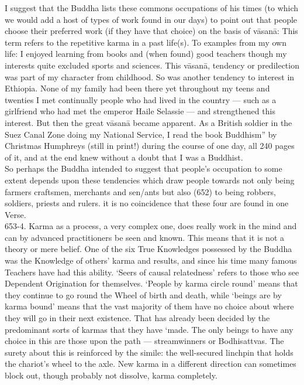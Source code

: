 I suggest that the Buddha lists these commons occupations of his times (to which we would add a host of types of work found in our days) to point out that people choose their preferred work (if they have that choice) on the basis of v\=asan\=a: This term refers to the repetitive karma in a past life(s). To examples from my own life: I enjoyed learning from books and (when found) good teachers though my interests quite excluded sports and sciences. This v\=asan\=a, tendency or predilection was part of my character from childhood. So was another tendency to interest in Ethiopia. None of my family had been there yet throughout my teens and twenties I met continually people who had lived in the country — such as a girlfriend who had met the emperor Haile Selassie — and strengthened this interest. But then the great v\=asan\=a became apparent. As a British soldier in the Suez Canal Zone doing my National Service, I read the book Buddhism” by Christmas Humphreys (still in print!) during the course of one day, all 240 pages of it, and at the end knew without a doubt that I was a Buddhist.\\

So perhaps the Buddha intended to suggest that people's occupation to some extent depends upon these tendencies which draw people towards not only being farmers craftsmen, merchants and sen/ants but also (652) to being robbers, soldiers, priests and rulers. it is no coincidence that these four are found in one Verse.\\

653-4. Karma as a process, a very complex one, does really work in the mind and can by advanced practitioners be seen and known. This means that it is not a theory or mere belief. One of the six True Knowledges possessed by the Buddha was the Knowledge of others' karma and results, and since his time many famous Teachers have had this ability. `Seers of causal relatedness' refers to those who see Dependent Origination for themselves. `People by karma circle round' means that they continue to go round the Wheel of birth and death, while `beings are by karma bound' means that the vast majority of them have no choice about where they will go in their next existence. That has already been decided by the predominant sorts of karmas that they have `made. The only beings to have any choice in this are those upon the path — streamwinners or Bodhisattvas. The surety about this is reinforced by the simile: the well-secured linchpin that holds the chariot's wheel to the axle. New karma in a different direction can sometimes block out, though probably not dissolve, karma completely.\\

